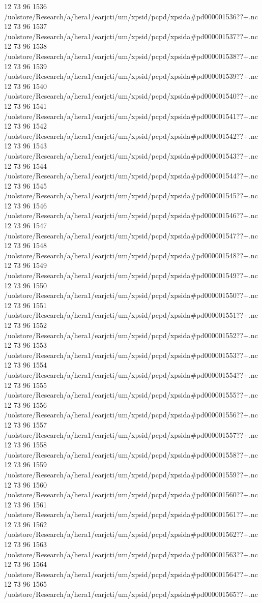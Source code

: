 12 73 96
1536
/uolstore/Research/a/hera1/earjcti/um/xpsid/pcpd/xpsida#pd000001536??+.nc
12 73 96
1537
/uolstore/Research/a/hera1/earjcti/um/xpsid/pcpd/xpsida#pd000001537??+.nc
12 73 96
1538
/uolstore/Research/a/hera1/earjcti/um/xpsid/pcpd/xpsida#pd000001538??+.nc
12 73 96
1539
/uolstore/Research/a/hera1/earjcti/um/xpsid/pcpd/xpsida#pd000001539??+.nc
12 73 96
1540
/uolstore/Research/a/hera1/earjcti/um/xpsid/pcpd/xpsida#pd000001540??+.nc
12 73 96
1541
/uolstore/Research/a/hera1/earjcti/um/xpsid/pcpd/xpsida#pd000001541??+.nc
12 73 96
1542
/uolstore/Research/a/hera1/earjcti/um/xpsid/pcpd/xpsida#pd000001542??+.nc
12 73 96
1543
/uolstore/Research/a/hera1/earjcti/um/xpsid/pcpd/xpsida#pd000001543??+.nc
12 73 96
1544
/uolstore/Research/a/hera1/earjcti/um/xpsid/pcpd/xpsida#pd000001544??+.nc
12 73 96
1545
/uolstore/Research/a/hera1/earjcti/um/xpsid/pcpd/xpsida#pd000001545??+.nc
12 73 96
1546
/uolstore/Research/a/hera1/earjcti/um/xpsid/pcpd/xpsida#pd000001546??+.nc
12 73 96
1547
/uolstore/Research/a/hera1/earjcti/um/xpsid/pcpd/xpsida#pd000001547??+.nc
12 73 96
1548
/uolstore/Research/a/hera1/earjcti/um/xpsid/pcpd/xpsida#pd000001548??+.nc
12 73 96
1549
/uolstore/Research/a/hera1/earjcti/um/xpsid/pcpd/xpsida#pd000001549??+.nc
12 73 96
1550
/uolstore/Research/a/hera1/earjcti/um/xpsid/pcpd/xpsida#pd000001550??+.nc
12 73 96
1551
/uolstore/Research/a/hera1/earjcti/um/xpsid/pcpd/xpsida#pd000001551??+.nc
12 73 96
1552
/uolstore/Research/a/hera1/earjcti/um/xpsid/pcpd/xpsida#pd000001552??+.nc
12 73 96
1553
/uolstore/Research/a/hera1/earjcti/um/xpsid/pcpd/xpsida#pd000001553??+.nc
12 73 96
1554
/uolstore/Research/a/hera1/earjcti/um/xpsid/pcpd/xpsida#pd000001554??+.nc
12 73 96
1555
/uolstore/Research/a/hera1/earjcti/um/xpsid/pcpd/xpsida#pd000001555??+.nc
12 73 96
1556
/uolstore/Research/a/hera1/earjcti/um/xpsid/pcpd/xpsida#pd000001556??+.nc
12 73 96
1557
/uolstore/Research/a/hera1/earjcti/um/xpsid/pcpd/xpsida#pd000001557??+.nc
12 73 96
1558
/uolstore/Research/a/hera1/earjcti/um/xpsid/pcpd/xpsida#pd000001558??+.nc
12 73 96
1559
/uolstore/Research/a/hera1/earjcti/um/xpsid/pcpd/xpsida#pd000001559??+.nc
12 73 96
1560
/uolstore/Research/a/hera1/earjcti/um/xpsid/pcpd/xpsida#pd000001560??+.nc
12 73 96
1561
/uolstore/Research/a/hera1/earjcti/um/xpsid/pcpd/xpsida#pd000001561??+.nc
12 73 96
1562
/uolstore/Research/a/hera1/earjcti/um/xpsid/pcpd/xpsida#pd000001562??+.nc
12 73 96
1563
/uolstore/Research/a/hera1/earjcti/um/xpsid/pcpd/xpsida#pd000001563??+.nc
12 73 96
1564
/uolstore/Research/a/hera1/earjcti/um/xpsid/pcpd/xpsida#pd000001564??+.nc
12 73 96
1565
/uolstore/Research/a/hera1/earjcti/um/xpsid/pcpd/xpsida#pd000001565??+.nc

